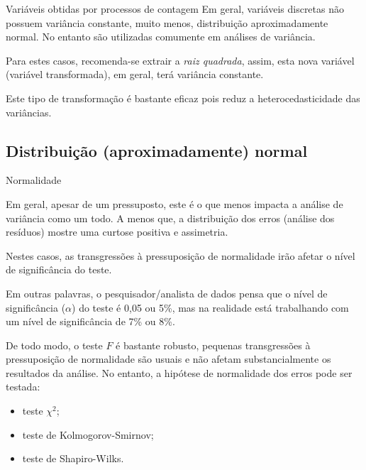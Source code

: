 \documentclass{bredelebeamer}
\begin{document}
\begin{frame}
\begin{alertblock}{Variáveis obtidas por processos de contagem}
Em geral, variáveis discretas não possuem variância constante, muito
menos, distribuição aproximadamente normal. No entanto são utilizadas
comumente em análises de variância.

\vspace{.5cm}

Para estes casos, recomenda-se extrair a \emph{raiz quadrada}, assim,
esta nova variável (variável transformada), em geral, terá variância
constante.

\vspace{.5cm}

Este tipo de transformação é bastante eficaz pois reduz a
heterocedasticidade das variâncias.
\end{alertblock}
\end{frame}

\subsection{Distribuição (aproximadamente) normal}

\begin{frame}
\begin{exampleblock}{Normalidade}
\footnotesize{
Em geral, apesar de um pressuposto, este é o que menos impacta a análise
de variância como um todo. A menos que, a distribuição dos erros
(análise dos resíduos) mostre uma curtose positiva e assimetria.

\vspace{.2cm}

Nestes casos, as transgressões à pressuposição de normalidade irão
afetar o nível de significância do teste. 

\vspace{.2cm}

Em outras palavras, o pesquisador/analista de dados pensa que o nível de
significância ($\alpha$) do teste é 0,05 ou 5\%, mas na realidade está
trabalhando com um nível de significância de 7\% ou 8\%. 

\vspace{.2cm}

De todo modo, o teste $F$ é bastante robusto, pequenas transgressões à
pressuposição de normalidade são usuais e não afetam substancialmente os
resultados da análise. No entanto, a hipótese de normalidade dos erros
pode ser testada:

\begin{itemize}
\item teste $\chi^{2}$;
\item teste de Kolmogorov-Smirnov;
\item teste de Shapiro-Wilks.
\end{itemize}

}
\end{exampleblock}
\end{frame}
\end{document}
